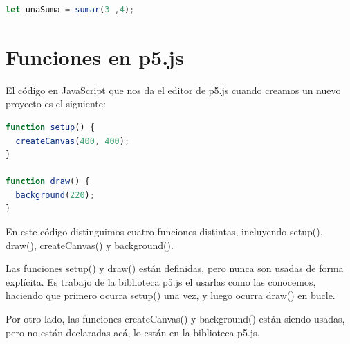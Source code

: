 \documentclass[../principal.tex]{subfiles}
\begin{document}
\begin{lstlisting}[language=JavaScript]
let unaSuma = sumar(3 ,4);
\end{lstlisting}


\section{Funciones en p5.js}

El código en JavaScript que nos da el editor de p5.js cuando creamos un nuevo proyecto es el siguiente:

\begin{lstlisting}[language=JavaScript]
function setup() {
  createCanvas(400, 400);
}

function draw() {
  background(220);
}
\end{lstlisting}

En este código distinguimos cuatro funciones distintas, incluyendo setup(), draw(), createCanvas() y background().

Las funciones setup() y draw() están definidas, pero nunca son usadas de forma explícita. Es trabajo de la biblioteca p5.js el usarlas como las conocemos, haciendo que primero ocurra setup() una vez, y luego ocurra draw() en bucle.

Por otro lado, las funciones createCanvas() y background() están siendo usadas, pero no están declaradas acá, lo están en la biblioteca p5.js.
\end{document}
